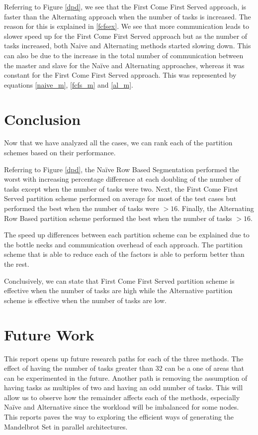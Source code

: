 \documentclass[conference]{IEEEtran}
\begin{document}
	Referring to Figure \ref{dpd}, we see that the First Come First Served approach, is faster than the Alternating approach when the number of tasks is increased. The reason for this is explained in \ref{fcfsex}. We see that more communication leads to slower speed up for the First Come First Served approach but as the number of tasks increased, both Naive and Alternating methods started slowing down. This can also be due to the increase in the total number of communication between the master and slave for the Naïve and Alternating approaches, whereas it was constant for the First Come First Served approach. This was represented by equations \ref{naive_m}, \ref{fcfs_m} and \ref{al_m}.

	\section{Conclusion}
	Now that we have analyzed all the cases, we can rank each of the partition schemes based on their performance. 
	
	Referring to Figure \ref{dpd}, the Naïve Row Based Segmentation performed the worst with increasing percentage difference at each doubling of the number of tasks except when the number of tasks were two. Next, the First Come First Served partition scheme performed on average for most of the test cases but performed the best when the number of tasks were $ > 16$. Finally, the Alternating Row Based partition scheme performed the best when the number of tasks $ > 16$. 
	
	The speed up differences between each partition scheme can be explained due to the bottle necks and communication overhead of each approach. The partition scheme that is able to reduce each of the factors is able to perform better than the rest.
	
	Conclusively, we can state that First Come First Served partition scheme is effective when the number of tasks are high while the Alternative partition scheme is effective when the number of tasks are low.
	
	\section{Future Work}
	This report opens up future research paths for each of the three methods. The effect of having the number of tasks greater than 32 can be a one of areas that can be experimented in the future. Another path is removing the assumption of having tasks as multiples of two and having an odd number of tasks. This will allow us to observe how the remainder affects each of the methods, especially Naïve and Alternative since the workload will be imbalanced for some nodes. 
	This reports paves the way to exploring the efficient ways of generating the Mandelbrot Set in parallel architectures.
	
\end{document}
